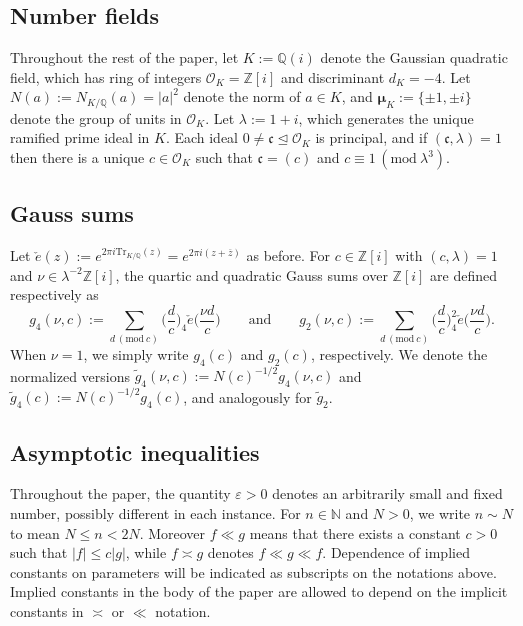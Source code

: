 \documentclass[12pt,reqno]{amsart}
\numberwithin{equation}{section}
\renewcommand{\pmod}[1]{\, (\mathrm{mod}\ #1)}
\newcommand{\Z}{\mathbb{Z}}
\newcommand{\Q}{\mathbb{Q}}
\begin{document}
\subsection{Number fields}

Throughout the rest of the paper, let $K:=\mathbb{Q}(i)$ denote the Gaussian quadratic field, which has ring of integers $\mathcal{O}_{K}=\mathbb{Z}[i]$ and discriminant $d_K=-4$. Let $N(a):=N_{K/\mathbb{Q}}(a)=|a|^2$ denote the norm of $a \in K$, and $\boldsymbol{\mu}_K:=\{\pm 1, \pm i \}$ denote the group of units in $\mathcal{O}_K$. Let $\lambda:=1+i$, which generates the unique ramified prime ideal in $K$. Each ideal $0 \neq \mathfrak{c} \unlhd \mathcal{O}_K$ is principal, and if $(\mathfrak{c},\lambda)=1$ then there is a unique $c \in \mathcal{O}_K$ such that $\mathfrak{c}=(c)$ and $c \equiv 1 \pmod{\lambda^{3}}$.

\subsection{Gauss sums}

Let $\check{e}(z):=e^{2 \pi i \text{Tr}_{K/\Q}(z)}=e^{2 \pi i(z+\overline{z})}$ as before. For $c \in \Z[i]$ with $(c,\lambda) =1$ and $\nu \in \lambda^{-2} \mathbb{Z}[i]$, the quartic and quadratic Gauss sums over $\Z[i]$ are defined respectively as
\begin{equation*}
    g_4(\nu,c) := \sum_{d \pmod c} \Big(\frac{d}{c}\Big)_4 \check{e} \Big(\frac{\nu d}{c}\Big) \qquad \text{and} \qquad g_2(\nu,c):= \sum_{d \pmod c} \Big(\frac{d}{c}\Big)^2_4 \check{e} \Big(\frac{\nu d}{c} \Big).
\end{equation*}
When $\nu =1$, we simply write $g_4(c)$ and $g_2(c)$, respectively. We denote the normalized versions $\widetilde{g}_4(\nu, c) := N(c)^{-1/2} g_4(\nu, c)$ and $\widetilde{g}_4(c) := N(c)^{-1/2} g_4(c)$, and analogously for $\widetilde{g}_2$.


\subsection{Asymptotic inequalities}
Throughout the paper, the quantity $\varepsilon>0$ denotes an arbitrarily small and fixed number, possibly different in each instance.
For $n \in \mathbb{N}$ and $N>0$, we write $n \sim N$ to mean $N \leq n < 2N$. Moreover $f \ll g$ means that there exists a constant $c > 0$ such that $|f| \leq c |g|$, while $f \asymp g$ denotes $f \ll g \ll f$. Dependence of implied constants on parameters will be indicated as subscripts on the notations above. Implied constants in the body of the paper are allowed to depend on the implicit constants in $\asymp$ or $\ll$ notation.
\end{document}

